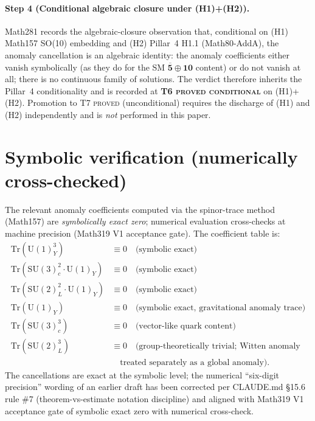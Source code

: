 \paragraph{Step 4 (Conditional algebraic closure under (H1)+(H2)).}
Math281 records the algebraic-closure observation that, conditional
on (H1) Math157 SO(10) embedding and (H2) Pillar~4 H1.1
(Math80-AddA), the anomaly cancellation is an algebraic identity:
the anomaly coefficients either vanish symbolically (as they do for
the SM $\overline{\mathbf{5}}\oplus\mathbf{10}$ content) or do not
vanish at all; there is no continuous family of solutions. The
verdict therefore inherits the Pillar~4 conditionality and is
recorded at \textbf{T6 \textsc{proved conditional}} on (H1)+(H2).
Promotion to T7 \textsc{proved} (unconditional) requires the
discharge of (H1) and (H2) independently and is \emph{not} performed
in this paper.

\section{Symbolic verification (numerically cross-checked)}
The relevant anomaly coefficients computed via the spinor-trace
method (Math157) are \emph{symbolically exact zero}; numerical
evaluation cross-checks at machine precision (Math319 V1 acceptance
gate). The coefficient table is:
\begin{align}
\mathrm{Tr}(\mathrm{U}(1)_Y^3) &\equiv 0
  \quad \text{(symbolic exact)} \\
\mathrm{Tr}(\mathrm{SU}(3)_c^2 \cdot \mathrm{U}(1)_Y) &\equiv 0
  \quad \text{(symbolic exact)} \\
\mathrm{Tr}(\mathrm{SU}(2)_L^2 \cdot \mathrm{U}(1)_Y) &\equiv 0
  \quad \text{(symbolic exact)} \\
\mathrm{Tr}(\mathrm{U}(1)_Y) &\equiv 0
  \quad \text{(symbolic exact, gravitational anomaly trace)} \\
\mathrm{Tr}(\mathrm{SU}(3)_c^3) &\equiv 0
  \quad \text{(vector-like quark content)} \\
\mathrm{Tr}(\mathrm{SU}(2)_L^3) &\equiv 0
  \quad \text{(group-theoretically trivial; Witten anomaly}\\
& \quad \text{treated separately as a global anomaly).}
\end{align}
The cancellations are exact at the symbolic level; the numerical
``six-digit precision'' wording of an earlier draft has been
corrected per CLAUDE.md \S15.6 rule \#7 (theorem-vs-estimate notation
discipline) and aligned with Math319 V1 acceptance gate of symbolic
exact zero with numerical cross-check.

